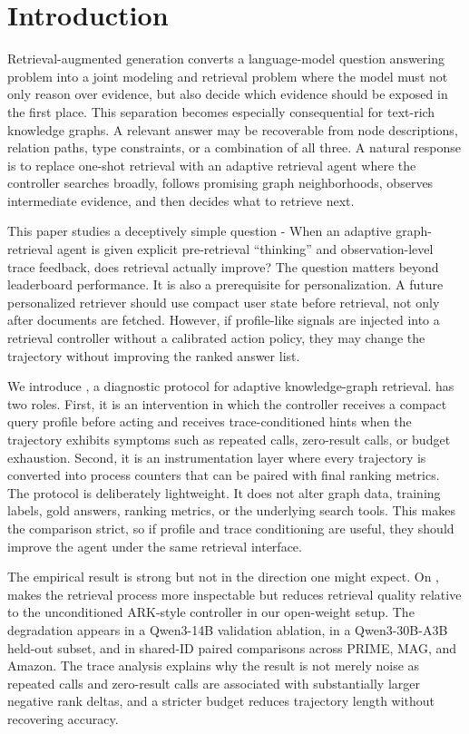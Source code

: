 \section{Introduction}
Retrieval-augmented generation converts a language-model question answering problem into a joint modeling and retrieval problem where the model must not only reason over evidence, but also decide which evidence should be exposed in the first place. This separation becomes especially consequential for text-rich knowledge graphs. A relevant answer may be recoverable from node descriptions, relation paths, type constraints, or a combination of all three. A natural response is to replace one-shot retrieval with an adaptive retrieval agent where the controller searches broadly, follows promising graph neighborhoods, observes intermediate evidence, and then decides what to retrieve next.

This paper studies a deceptively simple question - When an adaptive graph-retrieval agent is given explicit pre-retrieval ``thinking'' and observation-level trace feedback, does retrieval actually improve? The question matters beyond leaderboard performance. It is also a prerequisite for personalization. A future personalized retriever should use compact user state before retrieval, not only after documents are fetched. However, if profile-like signals are injected into a retrieval controller without a calibrated action policy, they may change the trajectory without improving the ranked answer list.

We introduce \textbf{\tb}, a diagnostic protocol for adaptive knowledge-graph retrieval. \tb has two roles. First, it is an intervention in which the controller receives a compact query profile before acting and receives trace-conditioned hints when the trajectory exhibits symptoms such as repeated calls, zero-result calls, or budget exhaustion. Second, it is an instrumentation layer where every trajectory is converted into process counters that can be paired with final ranking metrics. The protocol is deliberately lightweight. It does not alter graph data, training labels, gold answers, ranking metrics, or the underlying search tools. This makes the comparison strict, so if profile and trace conditioning are useful, they should improve the agent under the same retrieval interface.

The empirical result is strong but not in the direction one might expect. On \stark, \tb makes the retrieval process more inspectable but reduces retrieval quality relative to the unconditioned ARK-style controller in our open-weight setup. The degradation appears in a Qwen3-14B validation ablation, in a Qwen3-30B-A3B held-out subset, and in shared-ID paired comparisons across PRIME, MAG, and Amazon. The trace analysis explains why the result is not merely noise as repeated calls and zero-result calls are associated with substantially larger negative rank deltas, and a stricter budget reduces trajectory length without recovering accuracy.



